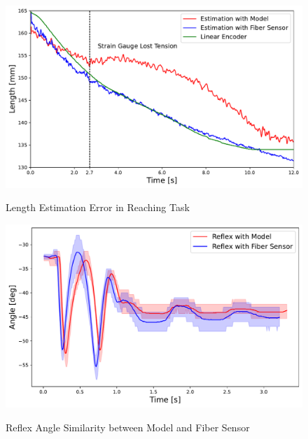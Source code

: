 \begin{figure}[t]
    \centering
    \begin{minipage}[H]{\textwidth} 
        \begin{minipage}[H]{0.48\textwidth} 
            \centering
            \includegraphics[width=\columnwidth]{fig/reaching_error.pdf}
            \caption{Length Estimation Error in Reaching Task}
            \label{fig:reaching_error}
            \vspace{1em}
            \includegraphics[width=\columnwidth]{fig/time_vs_angle_model_sensor.pdf}
            \caption{Reflex Angle Similarity between Model and Fiber Sensor}
            \label{fig:reflex_angle}
        \end{minipage}
        \hfill
        \begin{minipage}[H]{0.48\textwidth} 
            \centering

\end{minipage}
\end{minipage}
\end{figure}

